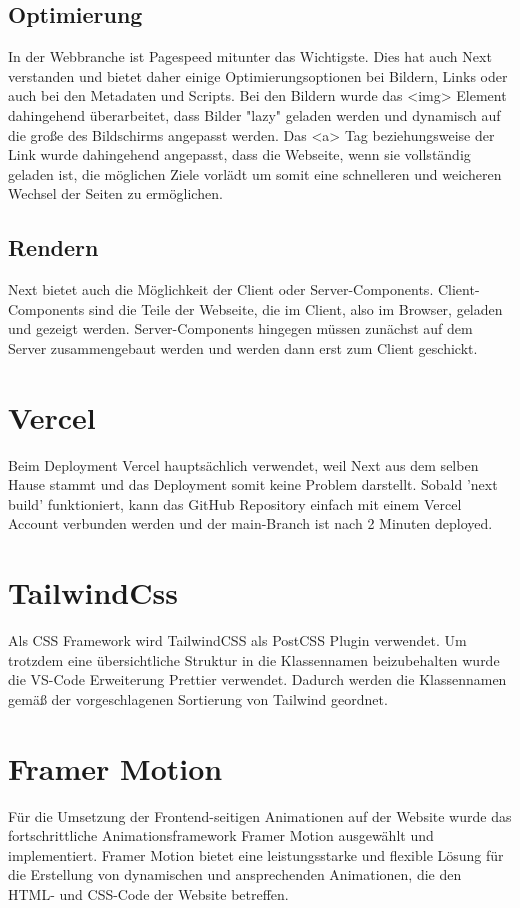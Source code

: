 \subsection{Optimierung}
In der Webbranche ist Pagespeed mitunter das Wichtigste. Dies hat auch Next verstanden und bietet daher einige Optimierungsoptionen bei Bildern, Links oder auch bei den Metadaten und Scripts. 
Bei den Bildern wurde das <img> Element dahingehend überarbeitet, dass Bilder "lazy" geladen werden und dynamisch auf die große des Bildschirms angepasst werden. 
Das <a> Tag beziehungsweise der Link wurde dahingehend angepasst, dass die Webseite, wenn sie vollständig geladen ist, die möglichen Ziele vorlädt um somit eine schnelleren und weicheren Wechsel der Seiten zu ermöglichen. \cite{nextjsdocsoptimizations}

\subsection{Rendern}
Next bietet auch die Möglichkeit der Client oder Server-Components. Client-Components sind die Teile der Webseite, die im Client, also im Browser, geladen und gezeigt werden.
Server-Components hingegen müssen zunächst auf dem Server zusammengebaut werden und werden dann erst zum Client geschickt. \cite{nextjsdocsrendering}

\section{Vercel}
Beim Deployment Vercel hauptsächlich verwendet, weil Next aus dem selben Hause stammt und das Deployment somit keine Problem darstellt.
Sobald 'next build' funktioniert, kann das GitHub Repository einfach mit einem Vercel Account verbunden werden und der main-Branch ist nach 2 Minuten deployed. \cite{vercel}

\section{TailwindCss}
Als CSS Framework wird TailwindCSS als PostCSS Plugin verwendet. 
Um trotzdem eine übersichtliche Struktur in die Klassennamen beizubehalten wurde die VS-Code Erweiterung Prettier verwendet. 
Dadurch werden die Klassennamen gemäß der vorgeschlagenen Sortierung von Tailwind geordnet.


\section{Framer Motion}
Für die Umsetzung der Frontend-seitigen Animationen auf der Website wurde das fortschrittliche Animationsframework 
Framer Motion ausgewählt und implementiert. Framer Motion bietet eine leistungsstarke und flexible Lösung für 
die Erstellung von dynamischen und ansprechenden Animationen, die den HTML- und CSS-Code der Website betreffen.

